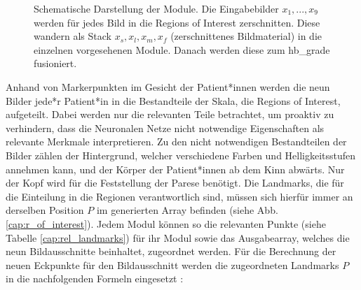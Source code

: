 \begin{figure}[!tb]
\caption[Darstellung der Modulbauweise]{{Schematische Darstellung der Module. Die Eingabebilder $x_1, ..., x_9$ werden für jedes Bild in die Regions of Interest zerschnitten. Diese wandern als Stack $x_s, x_l, x_m, x_f$ (zerschnittenes Bildmaterial) in die einzelnen vorgesehenen Module. Danach werden diese zum \ac{hb_grade} fusioniert.}\label{cap:module_graph}}
\end{figure}\label{fig:module_graph}

Anhand von Markerpunkten im Gesicht der Patient*innen werden die neun Bilder jede*r Patient*in in die Bestandteile der Skala, die Regions of Interest, aufgeteilt. Dabei werden nur die relevanten Teile betrachtet, um proaktiv zu verhindern, dass die Neuronalen Netze nicht notwendige Eigenschaften als relevante Merkmale interpretieren. Zu den nicht notwendigen Bestandteilen der Bilder zählen der Hintergrund, welcher verschiedene Farben und Helligkeitsstufen annehmen kann, und der Körper der Patient*innen ab dem Kinn abwärts. Nur der Kopf wird für die Feststellung der Parese benötigt. Die Landmarks, die für die Einteilung in die Regionen verantwortlich sind, müssen sich hierfür immer an derselben Position $P$ im generierten Array befinden (siehe Abb. \ref{cap:r_of_interest}). Jedem Modul können so die relevanten Punkte (siehe Tabelle \ref{cap:rel_landmarks}) für ihr Modul sowie das Ausgabearray, welches die neun Bildausschnitte beinhaltet, zugeordnet werden. Für die Berechnung der neuen Eckpunkte für den Bildausschnitt werden die zugeordneten Landmarks $P$ in die nachfolgenden Formeln eingesetzt \cite{s151026756}:

